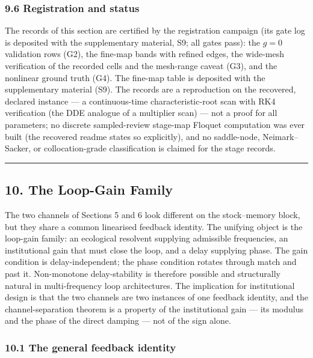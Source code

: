 \documentclass[11pt]{article}
\begin{document}
\subsubsection{9.6 Registration and
status}\label{registration-and-status}

The records of this section are certified by the registration campaign
(its gate log is deposited with the supplementary material, S9; all
gates pass): the \(g = 0\) validation rows (G2), the fine-map bands with
refined edges, the wide-mesh verification of the recorded cells and the
mesh-range caveat (G3), and the nonlinear ground truth (G4). The
fine-map table is deposited with the supplementary material (S9). The
records are a reproduction on the recovered, declared instance --- a
continuous-time characteristic-root scan with RK4 verification (the DDE
analogue of a multiplier scan) --- not a proof for all parameters; no
discrete sampled-review stage-map Floquet computation was ever built
(the recovered readme states so explicitly), and no saddle-node,
Neimark--Sacker, or collocation-grade classification is claimed for the
stage records.

\begin{center}\rule{0.5\linewidth}{0.5pt}\end{center}

\subsection{10. The Loop-Gain Family}\label{the-loop-gain-family}

The two channels of Sections 5 and 6 look different on the stock--memory
block, but they share a common linearised feedback identity. The
unifying object is the loop-gain family: an ecological resolvent
supplying admissible frequencies, an institutional gain that must close
the loop, and a delay supplying phase. The gain condition is
delay-independent; the phase condition rotates through match and past
it. Non-monotone delay-stability is therefore possible and structurally
natural in multi-frequency loop architectures. The implication for
institutional design is that the two channels are two instances of one
feedback identity, and the channel-separation theorem is a property of
the institutional gain --- its modulus and the phase of the direct
damping --- not of the sign alone.

\subsubsection{10.1 The general feedback
identity}\label{the-general-feedback-identity}
\end{document}
